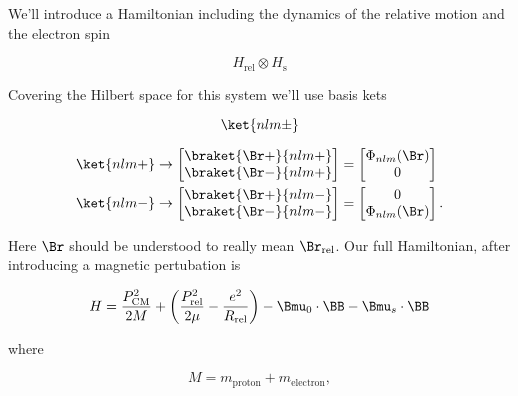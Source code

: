 We'll introduce a Hamiltonian including the dynamics of the relative motion and the electron spin

\begin{equation}\label{eqn:qmTwoL16:50}
H_{\text{rel}} \otimes H_{\text{s}}
\end{equation}

Covering the Hilbert space for this system we'll use basis kets 

\begin{equation}\label{eqn:qmTwoL16:70}
\ket{nlm\pm}
\end{equation}

\begin{equation}\label{eqn:qmTwoL16:90}
\begin{aligned}
\ket{nlm+} 
&\rightarrow 
\begin{bmatrix}
\braket{\Br+}{nlm+} \\
\braket{\Br-}{nlm+} \\
\end{bmatrix}
=
\begin{bmatrix}
\Phi_{nlm}(\Br) \\
0
\end{bmatrix} \\
\ket{nlm-} 
&\rightarrow 
\begin{bmatrix}
\braket{\Br+}{nlm-} \\
\braket{\Br-}{nlm-} \\
\end{bmatrix}
=
\begin{bmatrix}
0 \\
\Phi_{nlm}(\Br) 
\end{bmatrix}.
\end{aligned}
\end{equation}

Here $\Br$ should be understood to really mean $\Br_\text{rel}$.  Our full Hamiltonian, after introducing a magnetic pertubation is

\begin{equation}\label{eqn:qmTwoL16:110}
H = 
\frac{P_\text{CM}^2}{2M} 
+ 
\left(
\frac{P_\text{rel}^2}{2\mu}
-
\frac{e^2}{R_\text{rel}}
\right)
- \Bmu_0 \cdot \BB
- \Bmu_s \cdot \BB
\end{equation}

where 

\begin{equation}\label{eqn:qmTwoL16:130}
M = m_\text{proton} + m_\text{electron},
\end{equation}


